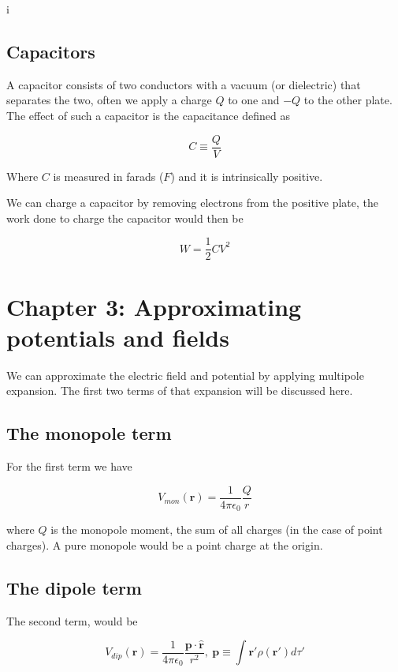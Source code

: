 i\documentclass[a4paper]{article}
\begin{document}
\subsection{Capacitors}
A capacitor consists of two conductors with a vacuum (or dielectric) that separates the two, often we apply a charge $Q$ to one and $-Q$ to the other plate. The effect of such a capacitor is the capacitance defined as

\begin{equation}
    C \equiv \frac{Q}{V}
\end{equation}

Where $C$ is measured in farads ($F$) and it is intrinsically positive. 

\bigskip

We can charge a capacitor by removing electrons from the positive plate, the work done to charge the capacitor would then be

\begin{equation}
    W=\frac{1}{2}CV^2
\end{equation}

\section{Chapter 3: Approximating potentials and fields}
We can approximate the electric field and potential by applying multipole expansion. The first two terms of that expansion will be discussed here.
\subsection{The monopole term}
For the first term we have 

\begin{equation}
    V_{mon}(\bm{r})=\frac{1}{4\pi\epsilon_0}\frac{Q}{r}
\end{equation}

where $Q$ is the monopole moment, the sum of all charges (in the case of point charges). A pure monopole would be a point charge at the origin.

\subsection{The dipole term}
The second term, would be

\begin{equation}
    V_{dip}(\bm{r})=\frac{1}{4\pi\epsilon_0}\frac{\bm{p}\cdot\hat{\bm{r}}}{r^2},\ \bm{p} \equiv \int \bm{r}'\rho(\bm{r}')d\tau'
\end{equation}
\end{document}
